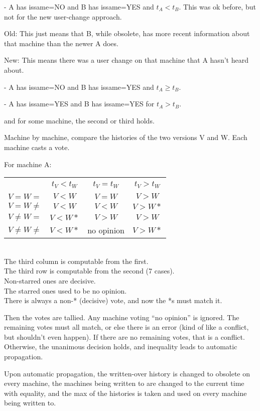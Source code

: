 \documentclass{book}
\begin{document}
    - A has issame=NO and B has issame=YES and $t_A < t_B$.   This was ok before, but not for the new user-change approach.

        Old: This just means that B, while obsolete, has more recent information about that machine than the newer A does.

        New: This means there was a user change on that machine that A hasn't heard about.

	- A has issame=NO and B has issame=YES and $t_A ≥ t_B$.

	- A has issame=YES and B has issame=YES for $t_A > t_B$.

and for some machine, the second or third holds.

Machine by machine, compare the histories of the two versions V and W.  Each machine casts a vote.

For machine A:

\begin{tabular}{cccc}
~       & $t_V < t_W$ & $t_V = t_W$ & $t_V > t_W$ \\
$V= W=$ & $V<W$       & $V=W$       & $V>W$       \\
$V= W≠$ & $V<W$       & $V<W$       & $V>W *$     \\
$V≠ W=$ & $V<W *$     & $V>W$       & $V>W$       \\
$V≠ W≠$ & $V<W *$     & no opinion  & $V>W *$     \\
\end{tabular}
\\ The third column is computable from the first.
\\ The third row is computable from the second (7 cases).
\\ Non-starred ones are decisive.
\\ The starred ones used to be no opinion.
\\ There is always a non-* (decisive) vote, and now the *s must match it.
 
Then the votes are tallied.  Any machine voting ``no opinion'' is ignored.  The remaining votes must all match, or else there is an error (kind of like a conflict, but shouldn't even happen).  If there are no remaining votes, that is a conflict.  Otherwise, the unanimous decision holds, and inequality leads to automatic propagation.

Upon automatic propagation, the written-over history is changed to obsolete on every machine, the machines being written to are changed to the current time with equality, and the max of the histories is taken and used on every machine being written to.
\end{document}
